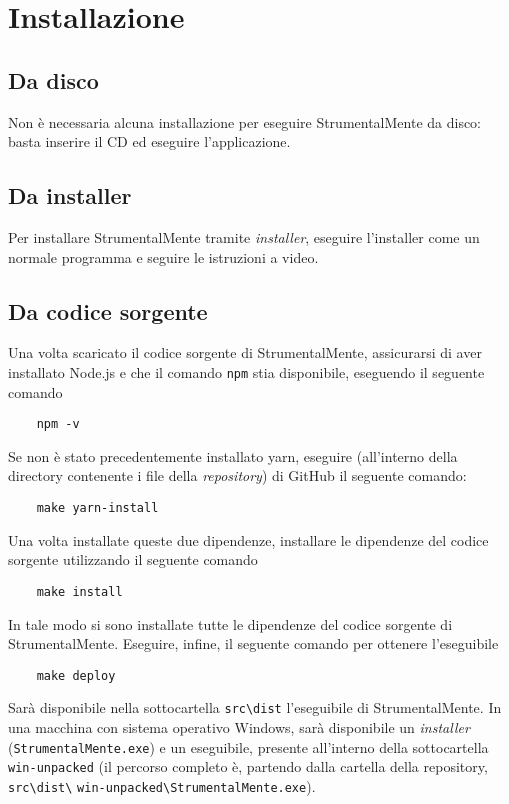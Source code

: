 \chapter{Installazione}
\section{Da disco}
Non è necessaria alcuna installazione per eseguire StrumentalMente da disco:
basta inserire il CD ed eseguire l'applicazione.
\section{Da installer}
Per installare StrumentalMente tramite \textit{installer}, eseguire l'installer come un
normale programma e seguire le istruzioni a video.
\section{Da codice sorgente}
Una volta scaricato il codice sorgente di StrumentalMente, assicurarsi di aver
installato Node.js e che il comando \texttt{npm} stia disponibile, eseguendo il
seguente comando
\begin{lstlisting}
	npm -v
\end{lstlisting}
Se non è stato precedentemente installato yarn, eseguire (all'interno della
directory contenente i file della \textit{repository}) di GitHub il seguente
comando:
\begin{lstlisting}
	make yarn-install
\end{lstlisting}
Una volta installate queste due dipendenze, installare le dipendenze del codice
sorgente utilizzando il seguente comando
\begin{lstlisting}
	make install
\end{lstlisting}
In tale modo si sono installate tutte le dipendenze del codice sorgente di
StrumentalMente. Eseguire, infine, il seguente comando per ottenere l'eseguibile
\begin{lstlisting}
	make deploy
\end{lstlisting}
Sarà disponibile nella sottocartella \texttt{src\textbackslash{}dist}
l'eseguibile di StrumentalMente. In una macchina con sistema operativo Windows,
sarà disponibile un \textit{installer} (\texttt{StrumentalMente.exe}) e un
eseguibile, presente all'interno della sottocartella \texttt{win-unpacked} (il
percorso completo è, partendo dalla cartella della repository,
\texttt{src\textbackslash{}dist\textbackslash{}}
\texttt{win-unpacked\textbackslash{}StrumentalMente.exe}).